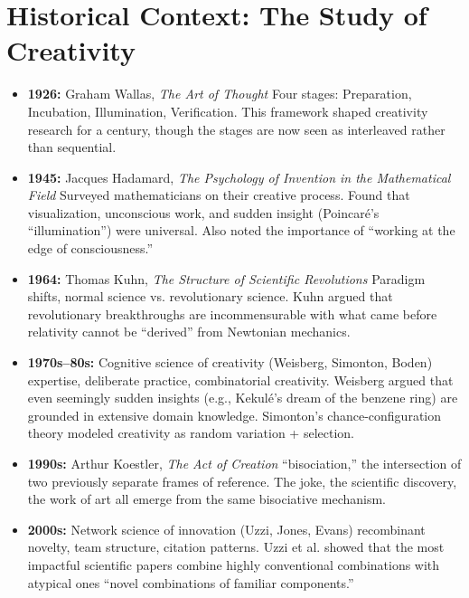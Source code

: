 \section{Historical Context: The Study of Creativity}
\label{sec:anatomy:context}

\begin{itemize}
\item \textbf{1926:} Graham Wallas, \emph{The Art of Thought} Four stages: Preparation, Incubation, Illumination, Verification. This framework shaped creativity research for a century, though the stages are now seen as interleaved rather than sequential.

\item \textbf{1945:} Jacques Hadamard, \emph{The Psychology of Invention in the Mathematical Field} Surveyed mathematicians on their creative process. Found that visualization, unconscious work, and sudden insight (Poincar\'e's ``illumination'') were universal. Also noted the importance of ``working at the edge of consciousness.''

\item \textbf{1964:} Thomas Kuhn, \emph{The Structure of Scientific Revolutions} Paradigm shifts, normal science vs. revolutionary science. Kuhn argued that revolutionary breakthroughs are incommensurable with what came before relativity cannot be ``derived'' from Newtonian mechanics.

\item \textbf{1970s--80s:} Cognitive science of creativity (Weisberg, Simonton, Boden) expertise, deliberate practice, combinatorial creativity. Weisberg argued that even seemingly sudden insights (e.g., Kekul\'e's dream of the benzene ring) are grounded in extensive domain knowledge. Simonton's chance-configuration theory modeled creativity as random variation + selection.

\item \textbf{1990s:} Arthur Koestler, \emph{The Act of Creation} ``bisociation,'' the intersection of two previously separate frames of reference. The joke, the scientific discovery, the work of art all emerge from the same bisociative mechanism.

\item \textbf{2000s:} Network science of innovation (Uzzi, Jones, Evans) recombinant novelty, team structure, citation patterns. Uzzi et al. showed that the most impactful scientific papers combine highly conventional combinations with atypical ones ``novel combinations of familiar components.''


\end{itemize}
